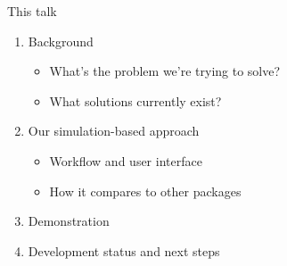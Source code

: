 \documentclass[11pt]{beamer}
\newcommand{\bgap}{\vspace{0.8em}}
\begin{document}
\begin{frame}[t]{This talk}
	\large
	\begin{enumerate}
		\item Background
		      \begin{itemize}
			      \item What's the problem we're trying to solve?
			      \item What solutions currently exist?
		      \end{itemize}
		\item Our simulation-based approach
		      \begin{itemize}
			      \item Workflow and user interface
			      \item How it compares to other packages
		      \end{itemize}
		\item Demonstration
		\item Development status and next steps
	\end{enumerate}

	\bgap
\end{frame}
\end{document}
